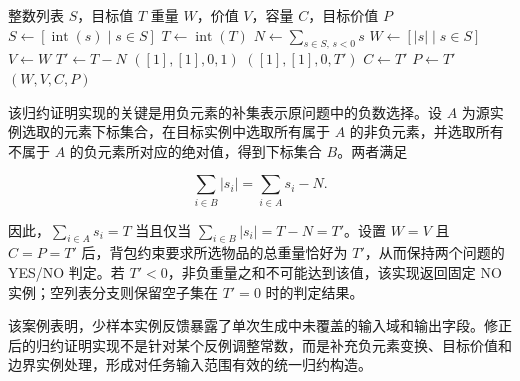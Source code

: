 \newpage
\begin{algorithm}[!htbp]
    \small
    \caption{少样本实例反馈下的归约证明实现}
    \label{alg:reduction-few-shot}
    \begin{algorithmic}[1]
        \Require 整数列表 \(S\)，目标值 \(T\)
        \Ensure 重量 \(W\)，价值 \(V\)，容量 \(C\)，目标价值 \(P\)
        \State \(S \gets [\operatorname{int}(s)\mid s\in S]\)
        \State \(T \gets \operatorname{int}(T)\)
        \State \(N \gets \sum_{s\in S,\,s<0}s\)
        \State \(W \gets [|s|\mid s\in S]\)
        \State \(V \gets W\)
        \State \(T' \gets T-N\)
            \State \Return \(([1],[1],0,1)\)
        \EndIf
            \State \Return \(([1],[1],0,T')\)
        \EndIf
        \State \(C \gets T'\)
        \State \(P \gets T'\)
        \State \Return \((W,V,C,P)\)
    \end{algorithmic}
\end{algorithm}

该归约证明实现的关键是用负元素的补集表示原问题中的负数选择。设 \(A\) 为源实例选取的元素下标集合，在目标实例中选取所有属于 \(A\) 的非负元素，并选取所有不属于 \(A\) 的负元素所对应的绝对值，得到下标集合 \(B\)。两者满足

\begin{equation}
    \sum_{i\in B}|s_i|
    =
    \sum_{i\in A}s_i-N.
    \label{eq:negative-subset-transform}
\end{equation}

因此，\(\sum_{i\in A}s_i=T\) 当且仅当 \(\sum_{i\in B}|s_i|=T-N=T'\)。设置 \(W=V\) 且 \(C=P=T'\) 后，背包约束要求所选物品的总重量恰好为 \(T'\)，从而保持两个问题的 YES/NO 判定。若 \(T'<0\)，非负重量之和不可能达到该值，该实现返回固定 NO 实例；空列表分支则保留空子集在 \(T'=0\) 时的判定结果。

该案例表明，少样本实例反馈暴露了单次生成中未覆盖的输入域和输出字段。修正后的归约证明实现不是针对某个反例调整常数，而是补充负元素变换、目标价值和边界实例处理，形成对任务输入范围有效的统一归约构造。
\FloatBarrier
